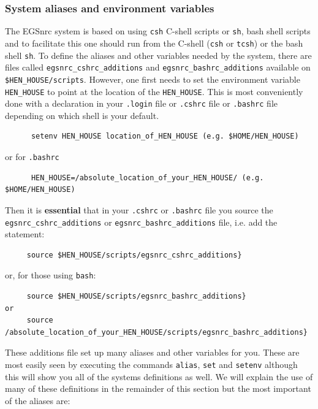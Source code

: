 \subsubsection{System aliases and environment variables}
 
 
The EGSnrc system is based on using {\tt csh} C-shell scripts or {\tt sh},
bash shell scripts and to
facilitate this one should run from the C-shell ({\tt csh} or {\tt tcsh})
or the bash shell {\tt sh}. 
To define the
aliases and other variables needed by the system, there are files called
{\tt egsnrc\_cshrc\_additions} and {\tt egsnrc\_bashrc\_additions} available on 
{\tt \$HEN\_HOUSE/scripts}.
However, one first needs to set the environment variable {\tt HEN\_HOUSE}
to point at the location of the {\tt HEN\_HOUSE}. This is most conveniently
done with a declaration in your {\tt .login} file or {\tt .cshrc} file or
{\tt .bashrc} file depending on which shell is your default. 
\begin{verbatim}
      setenv HEN_HOUSE location_of_HEN_HOUSE (e.g. $HOME/HEN_HOUSE)
\end{verbatim}
or for {\tt .bashrc}
\begin{verbatim}
      HEN_HOUSE=/absolute_location_of_your_HEN_HOUSE/ (e.g. $HOME/HEN_HOUSE)
\end{verbatim}
Then it is {\bfseries essential} that in your {\tt .cshrc} or {\tt .bashrc}  
file you source the 
{\tt  egsnrc\_cshrc\_additions} or {\tt egsnrc\_bashrc\_additions} file, i.e. add the statement:
\begin{verbatim}
     source $HEN_HOUSE/scripts/egsnrc_cshrc_additions}
\end{verbatim}
or, for those using {\tt bash}:
\begin{verbatim}
     source $HEN_HOUSE/scripts/egsnrc_bashrc_additions}
or
     source /absolute_location_of_your_HEN_HOUSE/scripts/egsnrc_bashrc_additions}
\end{verbatim}

These additions file set up many aliases and other variables for you. These
are most easily seen by executing the commands {\tt alias}, {\tt set} and
{\tt setenv} although this will show you all of the systems definitions as
well.  We will explain the use of many of these definitions in the
remainder of this section but the most important of the aliases are:

